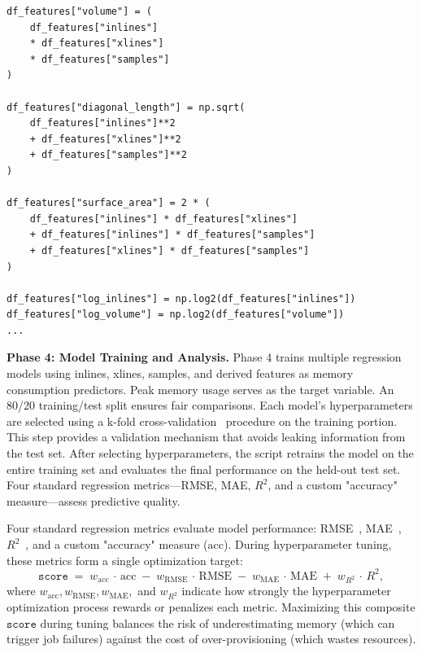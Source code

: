 \begin{lstlisting}[style=pythonstyle,
    caption={Feature extraction excerpt from \texttt{collect\_results.py}. Additional derived metrics capture polynomial or ratio-based growth.},
    label={lst:results_py}
]
df_features["volume"] = (
    df_features["inlines"]
    * df_features["xlines"]
    * df_features["samples"]
)

df_features["diagonal_length"] = np.sqrt(
    df_features["inlines"]**2
    + df_features["xlines"]**2
    + df_features["samples"]**2
)

df_features["surface_area"] = 2 * (
    df_features["inlines"] * df_features["xlines"]
    + df_features["inlines"] * df_features["samples"]
    + df_features["xlines"] * df_features["samples"]
)

df_features["log_inlines"] = np.log2(df_features["inlines"])
df_features["log_volume"] = np.log2(df_features["volume"])
...
\end{lstlisting}

\vspace{1em}
\noindent
\textbf{Phase 4: Model Training and Analysis.}
Phase 4 trains multiple regression models using inlines, xlines, samples, and derived features as memory consumption predictors.
Peak memory usage serves as the target variable.
An 80/20 training/test split ensures fair comparisons.
Each model's hyperparameters are selected using a k-fold cross-validation~\cite{kohavi1995study} procedure on the training portion.
This step provides a validation mechanism that avoids leaking information from the test set.
After selecting hyperparameters, the script retrains the model on the entire training set and evaluates the final performance on the held-out test set.
Four standard regression metrics—\ac{RMSE}, \ac{MAE}, \(R^2\), and a custom "accuracy" measure—assess predictive quality.

Four standard regression metrics evaluate model performance:
\ac{RMSE}~\cite{hyndman2006},
\ac{MAE}~\cite{willmott2005mae},
\(R^2\)~\cite{draper1998applied},
and a custom "accuracy" measure ($\mathrm{acc}$).
During hyperparameter tuning, these metrics form a single optimization target:
\[
    \texttt{score} \;=\;
    w_\mathrm{acc}\,\cdot\,\mathrm{acc}
    \;-\;
    w_\mathrm{RMSE}\,\cdot\,\mathrm{RMSE}
    \;-\;
    w_\mathrm{MAE}\,\cdot\,\mathrm{MAE}
    \;+\;
    w_{R^2}\,\cdot\,R^2,
\]
where \(w_\mathrm{acc}, w_\mathrm{RMSE}, w_\mathrm{MAE},\) and \(w_{R^2}\) indicate how strongly the hyperparameter optimization process rewards or penalizes each metric.
Maximizing this composite \(\texttt{score}\) during tuning balances the risk of underestimating memory (which can trigger job failures) against the cost of over-provisioning (which wastes resources).

